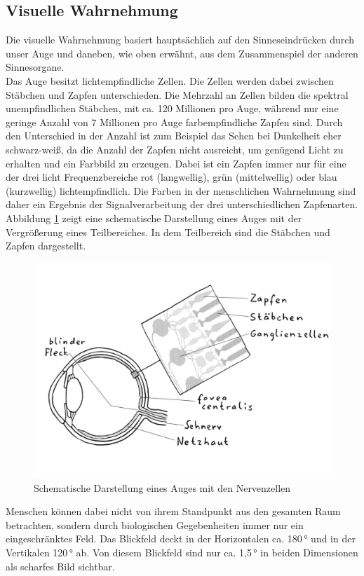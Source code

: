 \subsection{Visuelle Wahrnehmung}
Die visuelle Wahrnehmung basiert hauptsächlich auf den Sinneseindrücken durch unser Auge und daneben, wie oben erwähnt, aus dem Zusammenspiel der anderen Sinnesorgane. \\
Das Auge besitzt lichtempfindliche Zellen. Die Zellen werden dabei zwischen Stäbchen und Zapfen unterschieden. Die Mehrzahl an Zellen bilden die spektral unempfindlichen Stäbchen, mit ca. 120 Millionen pro Auge, während nur eine geringe Anzahl von 7 Millionen pro Auge farbempfindliche Zapfen sind. Durch den Unterschied in der Anzahl ist zum Beispiel das Sehen bei Dunkelheit eher schwarz-weiß, da die Anzahl der Zapfen nicht ausreicht, um genügend Licht zu erhalten und ein Farbbild zu erzeugen. Dabei ist ein Zapfen immer nur für eine der drei licht Frequenzbereiche rot (langwellig), grün (mittelwellig) oder blau (kurzwellig) lichtempfindlich. Die Farben in der menschlichen Wahrnehmung sind daher ein Ergebnis der Signalverarbeitung der drei unterschiedlichen Zapfenarten. \cite[Vgl. Seite 14]{Buhler.2017}\\
Abbildung \ref{fig:Auge} zeigt eine schematische Darstellung eines Auges mit der Vergrößerung eines Teilbereiches. In dem Teilbereich sind die Stäbchen und Zapfen dargestellt. \\
\begin{figure}[]
	\centering
	\includegraphics[width=0.5\linewidth]{images/Auge}
	\caption[Schematische Darstellung eines Auges mit den Nervenzellen]{Schematische Darstellung eines Auges mit den Nervenzellen \cite[Seite 141]{Schonhammer.2013}}
	\label{fig:Auge}
\end{figure}
Menschen können dabei nicht von ihrem Standpunkt aus den gesamten Raum betrachten, sondern durch biologischen Gegebenheiten immer nur ein eingeschränktes Feld. Das Blickfeld deckt in der Horizontalen ca. 180\,° und in der Vertikalen 120\,° ab. Von diesem Blickfeld sind nur ca. 1,5\,° in beiden Dimensionen als scharfes Bild sichtbar. \\

